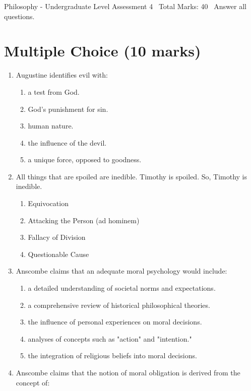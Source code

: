 \documentclass[12pt]{article}
\begin{document}
\begin{center}
Philosophy - Undergraduate Level Assessment 4 \
Total Marks: 40 \
Answer all questions.
\end{center}

\section*{Multiple Choice (10 marks)}
\begin{enumerate}[label=\arabic*.]
\item Augustine identifies evil with:
\begin{enumerate}[label=(\alph*)]
    \item a test from God.
    \item God's punishment for sin.
    \item human nature.
    \item the influence of the devil.
    \item a unique force, opposed to goodness.
\end{enumerate}
\item All things that are spoiled are inedible. Timothy is spoiled. So, Timothy is inedible.
\begin{enumerate}[label=(\alph*)]
    \item Equivocation
    \item Attacking the Person (ad hominem)
    \item Fallacy of Division
    \item Questionable Cause
\end{enumerate}
\item Anscombe claims that an adequate moral psychology would include:
\begin{enumerate}[label=(\alph*)]
    \item a detailed understanding of societal norms and expectations.
    \item a comprehensive review of historical philosophical theories.
    \item the influence of personal experiences on moral decisions.
    \item analyses of concepts such as "action" and "intention."
    \item the integration of religious beliefs into moral decisions.
\end{enumerate}
\item Anscombe claims that the notion of moral obligation is derived from the concept of:
\begin{enumerate}[label=(\alph*)]

\end{enumerate}
\end{enumerate}
\end{document}
